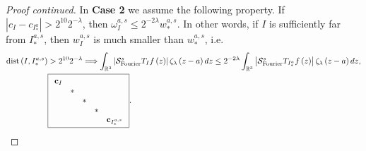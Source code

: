 \documentclass{amsart}%
\theoremstyle{plain}
\numberwithin{equation}{section}
\begin{document}
\begin{proof}
[Proof continued]In \textbf{Case 2} we assume the following property. If
$\left\vert c_{I}-c_{I_{\ast}^{a}}\right\vert >2^{10}2^{-\lambda}$, then
$\omega_{I}^{a,s}\leq2^{-2\lambda}w_{\ast}^{a,s}$. In other words, if $I$ is
sufficiently far from $I_{\ast}^{a,s}$, then $w_{I}^{a,s}$ is much smaller
than $w_{\ast}^{a,s}$, i.e.%
\begin{align*}
\operatorname*{dist}\left(  I,I_{\ast}^{a,s}\right)   &  >2^{10}2^{-\lambda
}\Longrightarrow\int_{\mathbb{R}^{3}}\left\vert \mathcal{S}%
_{\operatorname*{Fourier}}^{s}T_{I}f\left(  z\right)  \right\vert
\zeta_{\lambda}\left(  z-a\right)  dz\leq2^{-2\lambda}\int_{\mathbb{R}^{3}%
}\left\vert \mathcal{S}_{\operatorname*{Fourier}}^{s}T_{I_{\ast}^{a}}f\left(
z\right)  \right\vert \zeta_{\lambda}\left(  z-a\right)  dz,\\
&  \fbox{$%
\begin{array}
[c]{ccccc}%
\mathbf{c}_{I} &  &  &  & \\
& \ast &  &  & \\
&  & \ast &  & \\
&  &  & \ast & \\
&  &  &  & \mathbf{c}_{I_{\ast}^{a,s}}%
\end{array}
$}.
\end{align*}



\end{proof}
\end{document}
